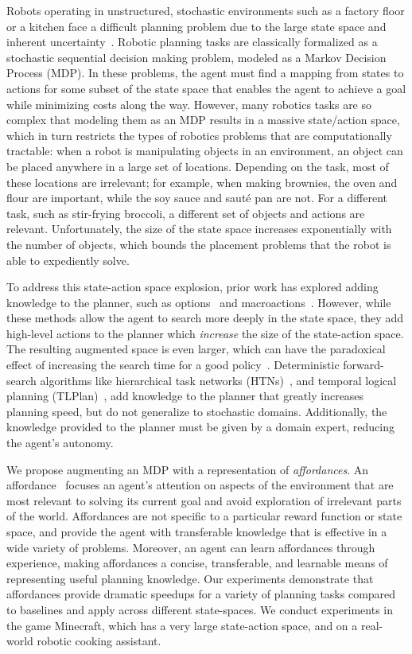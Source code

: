 \documentclass[conference]{IEEEtran}
\begin{document}
Robots operating in unstructured, stochastic environments such as a
factory floor or a kitchen face a difficult planning problem due to
the large state space and inherent
uncertainty~\citep{bollini12,knepper13}.  Robotic planning tasks are
classically formalized as a stochastic sequential decision making
problem, modeled as a Markov Decision Process (MDP). In these
problems, the agent must find a mapping from states to actions for
some subset of the state space that enables the agent to achieve a
goal while minimizing costs along the way. However, many robotics
tasks are so complex that modeling them as an MDP results in a massive
state/action space, which in turn restricts the types of robotics
problems that are computationally tractable: when a robot is
manipulating objects in an environment, an object can be placed
anywhere in a large set of locations.  Depending on the task, most of
these locations are irrelevant; for example, when making brownies, the
oven and flour are important, while the soy sauce and saut\'{e} pan
are not.  For a different task, such as stir-frying broccoli, a
different set of objects and actions are relevant.  Unfortunately, the
size of the state space increases exponentially with the number of
objects, which bounds the placement problems that the robot is able to
expediently solve.

To address this state-action space explosion, prior work has explored
adding knowledge to the planner, such as options~\cite{sutton99} and
macroactions~\cite{Botea:2005kx,Newton:2005vn}.  However, while these
methods allow the agent to search more deeply in the state space, they
add high-level actions to the planner which {\em increase} the size of
the state-action space.  The resulting augmented space is even larger,
which can have the paradoxical effect of increasing the search time
for a good policy~\cite{Jong:2008zr}.  
Deterministic forward-search algorithms like hierarchical task
networks (HTNs)~\citep{Nau:1999:SSH:1624312.1624357}, and temporal
logical planning (TLPlan)~\citep{Bacchus95usingtemporal,Bacchus99usingtemporal},
add knowledge to the planner that greatly increases planning speed, but do
not generalize to stochastic domains. Additionally, the knowledge
provided to the planner must be given by a domain expert, reducing the
agent's autonomy. 

We propose augmenting an MDP with a representation of 
{\em affordances}. An affordance~\cite{gibson77} focuses an
agent's attention on aspects of the environment that are
most relevant to solving its current goal and avoid exploration of
irrelevant parts of the world. Affordances are not specific to a particular
reward function or state space, and provide the agent with transferable 
knowledge that is effective in a wide variety of problems. Moreover, an 
agent can learn affordances through experience, making affordances a 
concise, transferable, and learnable means of representing useful planning
knowledge.  Our experiments demonstrate that affordances provide dramatic
speedups for a variety of planning tasks compared to baselines and apply across
different state-spaces.  We conduct experiments in the game Minecraft, which has
a very large state-action space, and on a real-world robotic cooking assistant.
\end{document}
